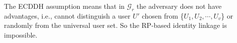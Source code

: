 The ECDDH assumption means that in $\mathcal{G}_r$ the adversary does not have advantages,
    i.e., cannot distinguish a user $U'$ chosen from \{${U_1}, {U_2}, \cdots, {U_v}$\}
        or randomly from the universal user set.
So the RP-based identity linkage is impossible.




